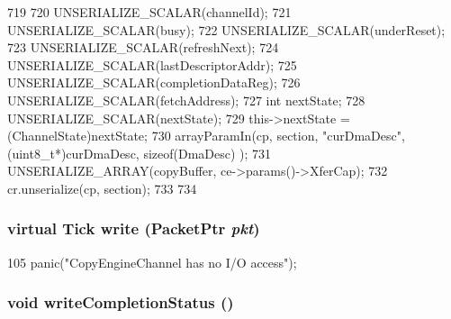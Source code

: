 \begin{DoxyCode}
719 {
720     UNSERIALIZE_SCALAR(channelId);
721     UNSERIALIZE_SCALAR(busy);
722     UNSERIALIZE_SCALAR(underReset);
723     UNSERIALIZE_SCALAR(refreshNext);
724     UNSERIALIZE_SCALAR(lastDescriptorAddr);
725     UNSERIALIZE_SCALAR(completionDataReg);
726     UNSERIALIZE_SCALAR(fetchAddress);
727     int nextState;
728     UNSERIALIZE_SCALAR(nextState);
729     this->nextState = (ChannelState)nextState;
730     arrayParamIn(cp, section, "curDmaDesc", (uint8_t*)curDmaDesc, sizeof(DmaDesc)
      );
731     UNSERIALIZE_ARRAY(copyBuffer, ce->params()->XferCap);
732     cr.unserialize(cp, section);
733 
734 }
\end{DoxyCode}
\hypertarget{classCopyEngine_1_1CopyEngineChannel_aeda092863c7ed5e4523d9b705d0d8c15}{
\subsubsection[{write}]{\setlength{\rightskip}{0pt plus 5cm}virtual {\bf Tick} write ({\bf PacketPtr} {\em pkt})}}
\label{classCopyEngine_1_1CopyEngineChannel_aeda092863c7ed5e4523d9b705d0d8c15}



\begin{DoxyCode}
105                         { panic("CopyEngineChannel has no I/O access\n"); }
\end{DoxyCode}
\hypertarget{classCopyEngine_1_1CopyEngineChannel_ad307f71461c646a5e9cd24579611f827}{
\subsubsection[{writeCompletionStatus}]{\setlength{\rightskip}{0pt plus 5cm}void writeCompletionStatus ()}}
\label{classCopyEngine_1_1CopyEngineChannel_ad307f71461c646a5e9cd24579611f827}



